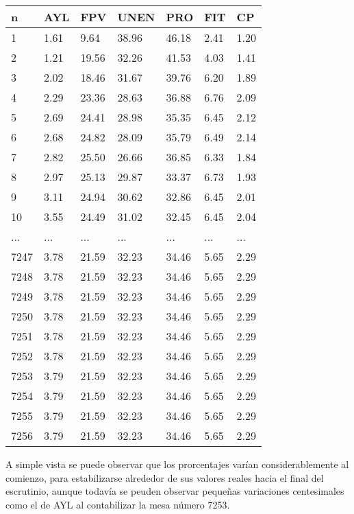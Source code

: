 \documentclass[12pt, a4paper]{article}
\begin{document}
\begin{center}
	\begin{tabular}{l | llllll}
n & AYL & FPV & UNEN & PRO & FIT & CP \\ \hline
1 & 1.61 & 9.64 & 38.96 & 46.18 & 2.41 & 1.20 \\
2 & 1.21 & 19.56 & 32.26 & 41.53 & 4.03 & 1.41 \\
3 & 2.02 & 18.46 & 31.67 & 39.76 & 6.20 & 1.89 \\
4 & 2.29 & 23.36 & 28.63 & 36.88 & 6.76 & 2.09 \\
5 & 2.69 & 24.41 & 28.98 & 35.35 & 6.45 & 2.12 \\
6 & 2.68 & 24.82 & 28.09 & 35.79 & 6.49 & 2.14 \\
7 & 2.82 & 25.50 & 26.66 & 36.85 & 6.33 & 1.84 \\
8 & 2.97 & 25.13 & 29.87 & 33.37 & 6.73 & 1.93 \\
9 & 3.11 & 24.94 & 30.62 & 32.86 & 6.45 & 2.01 \\
10 & 3.55 & 24.49 & 31.02 & 32.45 & 6.45 & 2.04 \\
... & ... & ... & ... & ... & ... & ...  \\
7247 & 3.78 & 21.59 & 32.23 & 34.46 & 5.65 & 2.29 \\
7248 & 3.78 & 21.59 & 32.23 & 34.46 & 5.65 & 2.29 \\
7249 & 3.78 & 21.59 & 32.23 & 34.46 & 5.65 & 2.29 \\
7250 & 3.78 & 21.59 & 32.23 & 34.46 & 5.65 & 2.29 \\
7251 & 3.78 & 21.59 & 32.23 & 34.46 & 5.65 & 2.29 \\
7252 & 3.78 & 21.59 & 32.23 & 34.46 & 5.65 & 2.29 \\
7253 & 3.79 & 21.59 & 32.23 & 34.46 & 5.65 & 2.29 \\
7254 & 3.79 & 21.59 & 32.23 & 34.46 & 5.65 & 2.29 \\
7255 & 3.79 & 21.59 & 32.23 & 34.46 & 5.65 & 2.29 \\
7256 & 3.79 & 21.59 & 32.23 & 34.46 & 5.65 & 2.29 \\
	\end{tabular}
\end{center}

A simple vista se puede observar que los prorcentajes var\'ian considerablemente al comienzo, para estabilizarse alrededor de sus valores reales hacia el final del escrutinio, aunque todav\'ia se peuden observar peque\~nas variaciones centesimales como el de AYL al contabilizar la mesa n\'umero 7253.
\end{document}
